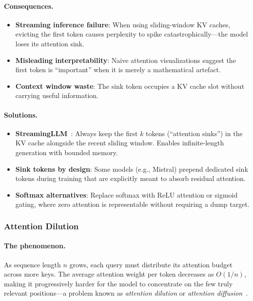 \paragraph{Consequences.}
\label{consequences.}

\begin{itemize}
  \item \textbf{Streaming inference failure}: When using sliding-window KV caches, evicting the first token causes perplexity to spike catastrophically---the model loses its attention sink.
  \item \textbf{Misleading interpretability}: Naive attention visualizations suggest the first token is ``important'' when it is merely a mathematical artefact.
  \item \textbf{Context window waste}: The sink token occupies a KV cache slot without carrying useful information.
\end{itemize}

\paragraph{Solutions.}
\label{solutions.}

\begin{itemize}
  \item \textbf{StreamingLLM}~\cite{xiao2024efficient}: Always keep the first $k$ tokens (``attention sinks'') in the KV cache alongside the recent sliding window. Enables infinite-length generation with bounded memory.
  \item \textbf{Sink tokens by design}: Some models (e.g., Mistral) prepend dedicated sink tokens during training that are explicitly meant to absorb residual attention.
  \item \textbf{Softmax alternatives}: Replace softmax with ReLU attention or sigmoid gating, where zero attention is representable without requiring a dump target.
\end{itemize}

\subsubsection{Attention Dilution}
\label{attention-dilution}

\paragraph{The phenomenon.}
\label{the-phenomenon.-1}

As sequence length $n$ grows, each query must distribute its attention budget across more keys. The average attention weight per token decreases as $O(1/n)$, making it progressively harder for the model to concentrate on the few truly relevant positions---a problem known as \emph{attention dilution} or \emph{attention diffusion}~\cite{liu2024lost}.

